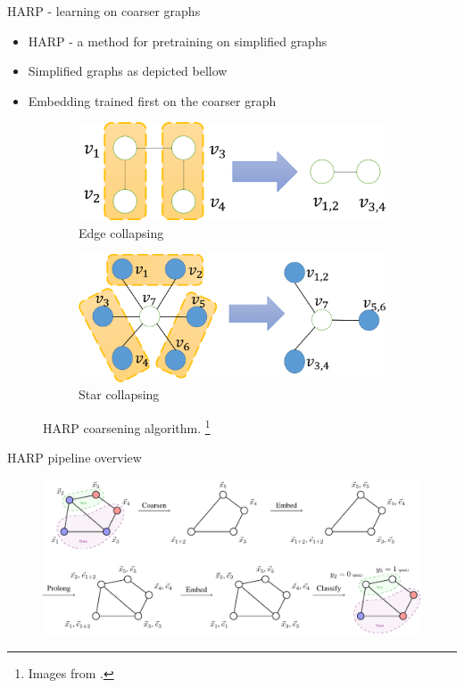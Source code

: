 \documentclass[10pt, aspectratio=169]{beamer}
\begin{document}
\begin{frame}{HARP - learning on coarser graphs}
	\begin{itemize}
		\item HARP - a method for pretraining on simplified graphs
		\item Simplified graphs as depicted bellow
		\item Embedding trained first on the coarser graph
	\end{itemize}
	\begin{figure}
		\centering
		\begin{subfigure}[t]{0.38\textwidth}
			\centering
			\includegraphics[width=\textwidth]{images/edge_collapsing.png}
			\caption{Edge collapsing}
		\end{subfigure}
		\hspace{2em}
		\begin{subfigure}[t]{0.38\textwidth}
			\centering
			\includegraphics[width=\textwidth]{images/star_collapsing.png}
			\caption{Star collapsing}
		\end{subfigure}
		\caption{HARP coarsening algorithm. \footnote{Images from \cite{chen_harp_2018}.}}
	\end{figure}
\end{frame}

\begin{frame}{HARP pipeline overview}
	\begin{figure}
		\centering
		\includegraphics[width=\textwidth]{images/harp-overview/harp-overview.pdf}
	\end{figure}
\end{frame}
\end{document}
